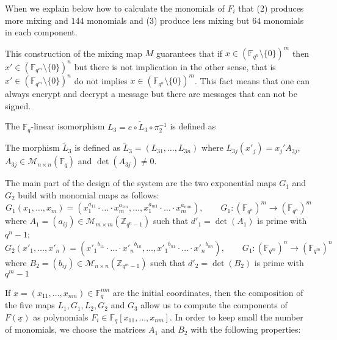 \documentclass[12pt,a4paper]{amsart}
\theoremstyle{remark}
\theoremstyle{definition}
\newcommand\gfq{\mathbb{F}_q}
\begin{document}
When we explain below how to calculate the monomials of  $F_i$ that (2) 
produces more mixing and $144$ monomials and (3) produce less mixing but $64$ monomials  in each component.

This construction of the mixing map $M$ guarantees that if $x\in ({\mathbb{F}}_{q^n}\setminus  \{0\} )^m$   then 
$x' \in ({\mathbb{F}}_{q^m}\setminus  \{0\} )^n$ but there is not implication in the  other sense, 
that is $x' \in ({\mathbb{F}}_{q^m}\setminus  \{0\} )^n$ do not implies  
$x\in ({\mathbb{F}}_{q^n}\setminus  \{0\} )^m$. 
This fact means that one can always encrypt and decrypt a 
message but there are messages that can not be signed.


The $\mathbb{F}_q$-linear isomorphism $L_3=e \circ\tilde{L}_3\circ\pi_2^{-1}$
is defined as
\begin{center}

\end{center}
The morphism $\tilde{L}_3$ is defined as $\tilde{L}_3=(L_{31},\dots,L_{3n})$ where
$L_{3j}(x'_j)=x_j' A_{3j}$, $A_{3j}\in\mathscr{M}_{n\times n}(\gfq)$ and
$\det(A_{3j})\neq 0$.

The main part of the design of the system are the two exponential maps
$G_1$ and $G_2$ build with monomial maps as follows:
\[
G_1(x_1,\dots,x_m)=(x_1^{a_{11}}\cdot\ldots\cdot x_m^{a_{1m}},\dots,x_1^{a_{m1}}\cdot\ldots\cdot x_m^{a_{mm}}),\qquad 
G_1:(\mathbb{F}_{q^n})^m\to(\mathbb{F}_{q^n})^m
\]
where $A_1=(a_{ij})\in\mathscr{M}_{m\times m}(\mathbb{Z}_{q^n-1})$ such that $d'_1=\det(A_1)$ is prime with $q^n-1$;
\[
G_2(x'_1,\dots,x'_n)=({x'_1}^{b_{11}}\cdot\ldots\cdot {x'_n}^{b_{1n}},\dots,{x'_1}^{b_{n1}}\cdot\ldots\cdot {x'_n}^{b_{nn}}),\qquad 
G_1:(\mathbb{F}_{q^m})^n\to(\mathbb{F}_{q^m})^n
\]
where $B_2=(b_{ij})\in\mathscr{M}_{n\times n}(\mathbb{Z}_{q^m-1})$ such that $d'_2=\det(B_2)$ is prime with $q^m-1$

If $\underline{x}=(x_{11},\dots,x_{nm})\in\gfq^{nm}$ are the initial coordinates, then
the composition of the five maps $L_1,G_1,L_2,G_2$ and $G_3$ allow us to compute 
the components of $F(\underline{x})$ as polynomials 
$F_i\in\mathbb{F}_q[x_{11},\dots,x_{nm}]$. In order to keep small the number
of monomials, we choose the matrices $A_1$ and $B_2$ with the following properties:
\end{document}
